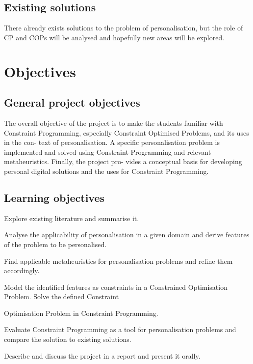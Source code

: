 \documentclass{acm_proc_article-sp}
\begin{document}
\subsection{Existing solutions}
There already exists solutions to the problem of personalisation, but the role of CP and COPs will be analysed and hopefully new areas will be explored.

\newpage
\section{Objectives}
\subsection{General project objectives}
The overall objective of the project is to make the students familiar with Constraint Programming, especially Constraint Optimised Problems, and its uses in the con- text of personalisation. A specific personalisation problem is implemented and solved using Constraint Programming and relevant metaheuristics. Finally, the project pro- vides a conceptual basis for developing personal digital solutions and the uses for Constraint Programming.

\subsection{Learning objectives}
Explore existing literature and summarise it.

Analyse the applicability of personalisation in a given domain and derive features of the problem to be personalised.

Find applicable metaheuristics for personalisation problems and refine them accordingly.

Model the identified features as constraints in a Constrained Optimisation Problem. Solve the defined Constraint 

Optimisation Problem in Constraint Programming.

Evaluate Constraint Programming as a tool for personalisation problems and compare the solution to existing solutions.

Describe and discuss the project in a report and present it orally.

%
%
%

\end{document}
